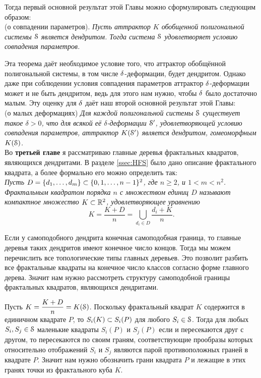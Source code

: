 Тогда первый основной результат этой Главы можно сформулировать следующим образом:\\

 (о совпадении параметров). 
{\em
Пусть аттрактор $K$ обобщенной полигональной системы ${\EuScript S}$ является дендритом. 
Тогда система ${\EuScript S}$ удовлетворяет условию совпадения параметров.}

Эта теорема даёт необходимое условие того, что аттрактор обобщённой полигональной системы, в том числе $\delta$-деформации, будет дендритом. 
Однако даже при соблюдении условия совпадения параметров аттрактор $\delta$-деформации может и не быть дендритом, ведь для этого нам нужно, чтобы $\delta$ было достаточно малым. 
Эту оценку для $\delta$ даёт наш второй основной результат этой Главы:\\

 (о малых деформациях)
{\em Для каждой полигональной системы ${\EuScript S}$ существует такое $\delta > 0$, что для всякой её $\delta$-деформации ${\EuScript S}'$, удовлетворяющей условию совпадения параметров, аттрактор $K({\EuScript S}')$ является дендритом, гомеоморфным $K({\EuScript S})$.}\\


Во {\bf третьей главе} я рассматриваю главные деревья фрактальных квадратов, являющихся дендритами.
В разделе \ref{ssec:HFS} было дано описание фрактального квадрата, а более формально его можно определить так:\\

{\em Пусть $D=\{d_1,\ldots,d_m\}\subset\{0,1,\ldots,n-1\}^2$, где $n\ge 2$, и $1<m<n^2$. 
{\em Фрактальным квадратом} порядка $n$ с {\em множеством единиц $D$} называют компактное множество $K\subset\mathbb{R}^2$, удовлетворяющее уравнению
$$K=\dfrac{K+D}{n}=\bigcup_{d_i\in D}\dfrac{d_i+K}{n}.$$}

Если у самоподобного дендрита конечная самоподобная граница, то главные деревья таких дендритов имеют конечное число концов.
Тогда мы можем перечислить все топологические типы главных деревьев.
Это позволит разбить все фрактальные квадраты на конечное число классов согласно форме главного дерева.
Значит нам нужно рассмотреть структуру самоподобной границы фрактальных квадратов, являющихся дендритами.

Пусть $K=\dfrac{K+D}{n}=K({\EuScript S})$.
Поскольку фрактальный квадрат $K$ содержится в единичном квадрате $P$, то $S_i(K)\subset S_i(P)$ для любого $S_i\in{\EuScript S}$.
Тогда для любых $S_i, S_j\in{\EuScript S}$ маленькие квадраты $S_i(P)$ и $S_j(P)$ если и пересекаются друг с другом, то пересекаются по своим граням, соответствующие прообразы которых относительно отображений $S_i$ и $S_j$ являются парой противоположных граней в квадрате $P$.
Значит нам нужно обозначить грани квадрата $P$ и лежащие в этих гранях точки из фрактального куба $K$.

